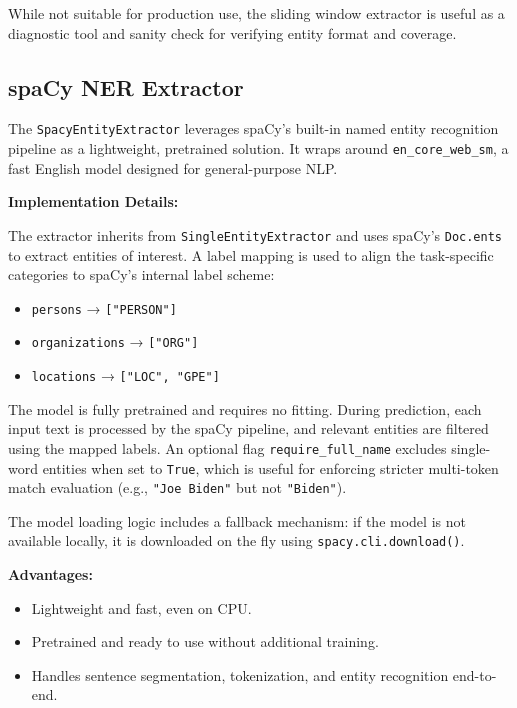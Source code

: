 While not suitable for production use, the sliding window extractor is useful as a diagnostic tool and sanity check for verifying entity format and coverage.


\subsection{spaCy NER Extractor}

The \texttt{SpacyEntityExtractor} leverages spaCy’s built-in named entity recognition pipeline as a lightweight, pretrained solution. It wraps around \texttt{en\_core\_web\_sm}, a fast English model designed for general-purpose NLP.

\textbf{Implementation Details:}

The extractor inherits from \texttt{SingleEntityExtractor} and uses spaCy’s \texttt{Doc.ents} to extract entities of interest. A label mapping is used to align the task-specific categories to spaCy’s internal label scheme:

\begin{itemize}
  \item \texttt{persons} → \texttt{["PERSON"]}
  \item \texttt{organizations} → \texttt{["ORG"]}
  \item \texttt{locations} → \texttt{["LOC", "GPE"]}
\end{itemize}

The model is fully pretrained and requires no fitting. During prediction, each input text is processed by the spaCy pipeline, and relevant entities are filtered using the mapped labels. An optional flag \texttt{require\_full\_name} excludes single-word entities when set to \texttt{True}, which is useful for enforcing stricter multi-token match evaluation (e.g., \texttt{"Joe Biden"} but not \texttt{"Biden"}).

The model loading logic includes a fallback mechanism: if the model is not available locally, it is downloaded on the fly using \texttt{spacy.cli.download()}.

\textbf{Advantages:}
\begin{itemize}
  \item Lightweight and fast, even on CPU.
  \item Pretrained and ready to use without additional training.
  \item Handles sentence segmentation, tokenization, and entity recognition end-to-end.
\end{itemize}

